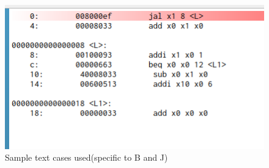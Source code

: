 \documentclass{article}
\begin{document}
\begin{itemize}
\begin{figure}
        \includegraphics[width=\textwidth]{test3.png}
        \caption[short]{Sample text cases used(specific to B and J)}
    \end{figure}
\end{itemize}
\end{document}
